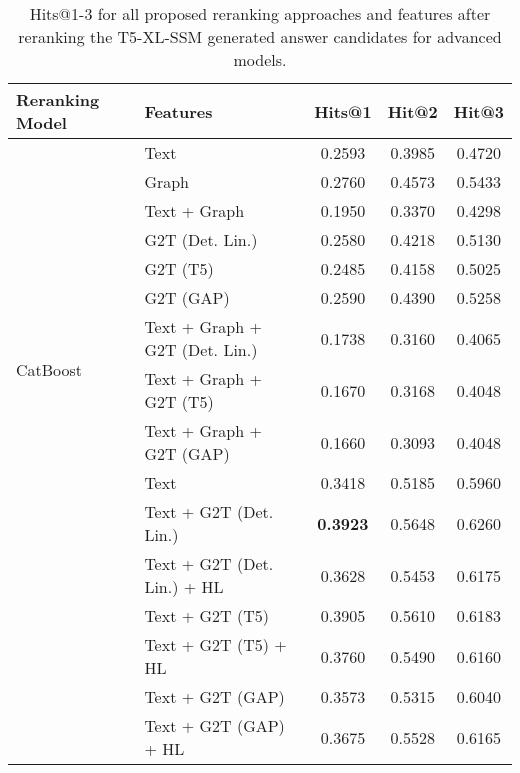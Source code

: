 \begin{table}[htbp]
    \caption{Hits@1-3 for all proposed reranking approaches and features after reranking the T5-XL-SSM generated answer candidates for advanced models.}
    \label{tab:controllable_fusion:t5_xl_ssm_all_results2}
    \centering
    \begin{tabular}{l p{6cm} c c c}
        \toprule
        \textbf{Reranking Model} & \textbf{Features} & \textbf{Hits@1} & \textbf{Hit@2} & \textbf{Hit@3} \\
        \midrule
        \multirow{12}{*}{CatBoost} & Text & 0.2593 & 0.3985 & 0.4720 \\
        & Graph & 0.2760 & 0.4573 & 0.5433 \\
        & Text + Graph & 0.1950 & 0.3370 & 0.4298 \\
        & G2T (Det. Lin.) & 0.2580 & 0.4218 & 0.5130 \\
        & G2T (T5) & 0.2485 & 0.4158 & 0.5025 \\
        & G2T (GAP) & 0.2590 & 0.4390 & 0.5258 \\
        & Text + Graph + G2T (Det. Lin.) & 0.1738 & 0.3160 & 0.4065 \\
        & Text + Graph + G2T (T5) & 0.1670 & 0.3168 & 0.4048 \\
        & Text + Graph + G2T (GAP) & 0.1660 & 0.3093 & 0.4048 \\
        \midrule
        \multirow{10}{*}{MPNet} & Text & 0.3418 & 0.5185 & 0.5960 \\
        & Text + G2T (Det. Lin.) & \textbf{0.3923} & 0.5648 & 0.6260 \\
        & Text + G2T (Det. Lin.) + HL & 0.3628 & 0.5453 & 0.6175 \\
        & Text + G2T (T5) & 0.3905 & 0.5610 & 0.6183 \\
        & Text + G2T (T5) + HL & 0.3760 & 0.5490 & 0.6160 \\
        & Text + G2T (GAP) & 0.3573 & 0.5315 & 0.6040 \\
        & Text + G2T (GAP) + HL & 0.3675 & 0.5528 & 0.6165 \\
        \bottomrule
    \end{tabular}
\end{table}



